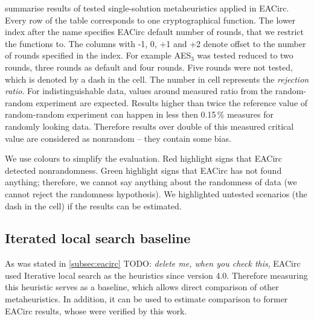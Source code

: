\documentclass[
  print, %
  Table,   %
  nolof,     %
  nolot,     %
  11pt, %
  oneside  %
]{fithesis3}
\newcommand{\todo}[1]{TODO: \textit{#1}}
\begin{document}
 summarise results of tested single-solution metaheuristics applied in EACirc. Every row of the table corresponds to one cryptographical function. The lower index after the name specifies EACirc default number of rounds, that we restrict the functions to. The columns with -1, 0, +1 and +2 denote offset to the number of rounds specified in the index. For example AES$_{3}$ was tested reduced to two rounds, three rounds as default and four rounds. Five rounds were not tested, which is denoted by a dash in the cell. The number in cell represents the \textit{rejection ratio}. For indistinguishable data, values around measured ratio from the random-random experiment are expected. Results higher than twice the reference value of random-random experiment can happen in less then 0.15\,\% measures for randomly looking data. Therefore results over double of this measured critical value are considered as nonrandom -- they contain some bias.

We use colours to simplify the evaluation. Red highlight signs that EACirc detected nonrandomness. Green highlight signs that EACirc has not found anything; therefore, we cannot say anything about the randomness of data (we cannot reject the randomness hypothesis). We highlighted untested scenarios (the dash in the cell) if the results can be estimated.

\subsection{Iterated local search baseline}
\label{subsec:res-ss-ils}

As was stated in \cref{subsec:eacirc} \todo{delete me, when you check this}, EACirc used Iterative local search as the heuristics since version 4.0. Therefore measuring this heuristic serves as a baseline, which allows direct comparison of other metaheuristics. In addition, it can be used to estimate comparison to former EACirc results, whose were verified by this work.
\end{document}
